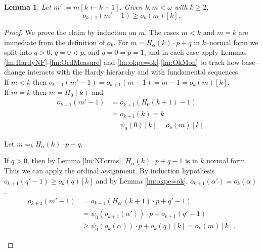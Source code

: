\documentclass{amsart}
\theoremstyle{plain}
\theoremstyle{plain}
\newtheorem{lemma}[theorem]{Lemma}
\newcommand{\kp}{[k\leftarrow k+1]}
\newcommand{\okpe}{o_{k+1}}
\newcommand{\ok}{o_{k}}
\newcommand{\al}{{\alpha}}
\newcommand{\om}{\omega}
\begin{document}
\begin{lemma}\label{lm:LemmaInd} Let $m':= m\kp$. Given $k,m<\om$ with $k\geq 2$,
\[\okpe(m'-1) \geq \ok(m)[k].\]
\end{lemma}
\begin{proof}
We prove the claim by induction on $m$. 
The cases $m<k$ and $m=k$ are immediate from the definition of $o_k$. For $m=H_\alpha(k)\cdot p+q$ in $k$–normal form we split into $q>0$, $q=0<p$, and $q=0=p=1$, and in each case apply Lemmas \ref{lm:HardyNF}-\ref{lm:OrdMeasure} and \ref{lm:okpe=ok}-\ref{lm:OkMon} to track how base–change interacts with the Hardy hierarchy and with fundamental sequences.
\\
If  $m<k$ then $\okpe(m'-1) = \okpe(m-1)=m-1= \ok(m)[k]$.
\\
If $m=k$ then $m= H_0(k)$ and 
\begin{align*} 
    \okpe(m'-1)& =\okpe(H_{0} (k+1) -1)\\
    &= \okpe(k ) =k \\
    &= \psi_0(0)[k]=\ok(m)[k].
\end{align*}

Let $m=_k H_\al(k)\cdot p +q$.
\begin{Cases}
\item If $q>0$, then by Lemma \ref{lm:NForms}, $H_\al(k) \cdot p+ q-1$ is in $k$ normal form. Thus we can apply the ordinal assignment. By induction hypothesis $ \okpe(q'-1) \geq \ok(q)[k]$ and by Lemma \ref{lm:okpe=ok}, $\okpe(\al') = \ok(\al)$.
\begin{align*} 
        \okpe(m'-1)& =\okpe(H_{\al'} (k+1) \cdot p + q'-1)\\
        & =\psi_0(\okpe(\al'))\cdot p + \okpe(q'-1)\\
        &\geq \psi_0(\ok(\al))\cdot p + \ok(q)[k]=\ok(m)[k].
\end{align*}


\end{Cases}
\end{proof}
\end{document}
